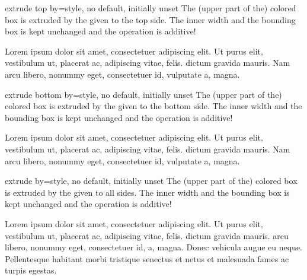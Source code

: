 \clearpage
\begin{docTcbKey}{extrude top by}{=}{style, no default, initially unset}
  The (upper part of the) colored box is extruded by the given  to the top side.
  The inner width and the bounding box is kept unchanged and the operation
  is additive!
\begin{dispExample}

Lorem ipsum dolor sit amet, consectetuer adipiscing elit. Ut purus elit,
vestibulum ut, placerat ac, adipiscing vitae, felis.
 dictum gravida mauris.
Nam arcu libero, nonummy eget, consectetuer id, vulputate a, magna.
\end{dispExample}
\end{docTcbKey}

\begin{docTcbKey}{extrude bottom by}{=}{style, no default, initially unset}
  The (upper part of the) colored box is extruded by the given  to the bottom side.
  The inner width and the bounding box is kept unchanged and the operation
  is additive!
\begin{dispExample}

Lorem ipsum dolor sit amet, consectetuer adipiscing elit. Ut purus elit,
vestibulum ut, placerat ac, adipiscing vitae, felis.
 dictum gravida mauris.
Nam arcu libero, nonummy eget, consectetuer id, vulputate a, magna.
\end{dispExample}
\end{docTcbKey}

\begin{docTcbKey}{extrude by}{=}{style, no default, initially unset}
  The (upper part of the) colored box is extruded by the given  to all sides.
  The inner width and the bounding box is kept unchanged and the operation
  is additive!
\begin{dispExample}

Lorem ipsum dolor sit amet, consectetuer adipiscing elit. Ut purus elit,
vestibulum ut, placerat ac, adipiscing vitae, felis.  dictum
gravida mauris. 
arcu libero, nonummy eget, consectetuer id,  a, magna. Donec
vehicula augue eu neque. Pellentesque habitant morbi tristique senectus et netus
et malesuada fames ac turpis egestas. 
\end{dispExample}
\end{docTcbKey}

